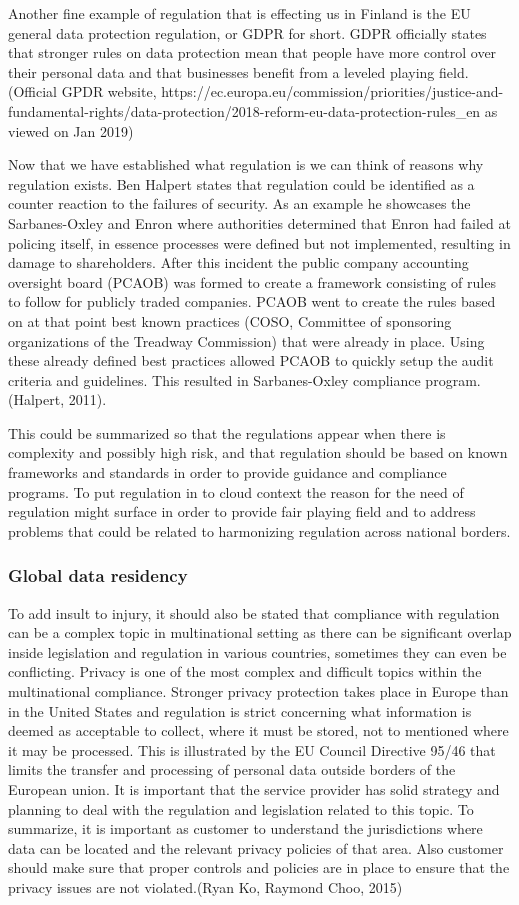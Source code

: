 \documentclass{article}
\begin{document}
Another fine example of regulation that is effecting us in Finland is the EU general data protection regulation, or GDPR for short. GDPR officially states that stronger rules on data protection mean that people have more control over their personal data and that businesses benefit from a leveled playing field. (Official GPDR website, https://ec.europa.eu/commission/priorities/justice-and-fundamental-rights/data-protection/2018-reform-eu-data-protection-rules\_en as viewed on Jan 2019)
\par
Now that we have established what regulation is we can think of reasons why regulation exists. Ben Halpert states that regulation could be identified as a counter reaction to the failures of security. As an example he showcases the Sarbanes-Oxley and Enron where authorities determined that Enron had failed at policing itself, in essence processes were defined but not implemented, resulting in damage to shareholders. After this incident the public company accounting oversight board (PCAOB) was formed to create a framework consisting of rules to follow for publicly traded companies.
PCAOB went to create the rules based on at that point best known practices (COSO, Committee of sponsoring organizations of the Treadway Commission) that were already in place. Using these already defined best practices allowed PCAOB to quickly setup the audit criteria and guidelines. This resulted in Sarbanes-Oxley compliance program.
(Halpert, 2011).
\par
This could be summarized so that the regulations appear when there is complexity and possibly high risk, and that regulation should be based on known frameworks and standards in order to provide guidance and compliance programs.
To put regulation in to cloud context the reason for the need of regulation might surface in order to provide fair playing field and to address problems that could be related to harmonizing regulation across national borders.
\subsubsection{Global data residency}
To add insult to injury, it should also be stated that compliance with regulation can be a complex topic in multinational setting as there can be significant overlap inside legislation and regulation in various countries, sometimes they can even be conflicting. Privacy is one of the most complex and difficult topics within the multinational compliance. Stronger privacy protection takes place in Europe than in the United States and regulation is strict concerning what information is deemed as acceptable to collect, where it must be stored, not to mentioned where it may be processed. This is illustrated by the EU Council Directive 95/46 that limits the transfer and processing of personal data outside borders of the European union. It is important that the service provider has solid strategy and planning to deal with the regulation and legislation related to this topic. To summarize, it is important as customer to understand the jurisdictions where data can be located and the relevant privacy policies of that area. Also customer should make sure that proper controls and policies are in place to ensure that the privacy issues are not violated.(Ryan Ko, Raymond Choo, 2015)
\end{document}
